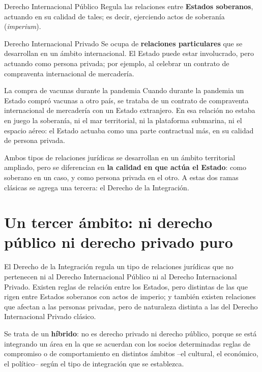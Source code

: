 \documentclass[12pt,oneside]{book}
\begin{document}
\begin{definicion}{Derecho Internacional Público}
Regula las relaciones entre \textbf{Estados soberanos}, actuando en su calidad de tales; es decir, ejerciendo actos de soberanía (\emph{imperium}).
\end{definicion}

\begin{definicion}{Derecho Internacional Privado}
Se ocupa de \textbf{relaciones particulares} que se desarrollan en un ámbito internacional. El Estado puede estar involucrado, pero actuando como persona privada; por ejemplo, al celebrar un contrato de compraventa internacional de mercadería.
\end{definicion}

\begin{ejemplo}{La compra de vacunas durante la pandemia}
Cuando durante la pandemia un Estado compró vacunas a otro país, se trataba de un contrato de compraventa internacional de mercadería con un Estado extranjero. En esa relación no estaba en juego la soberanía, ni el mar territorial, ni la plataforma submarina, ni el espacio aéreo: el Estado actuaba como una parte contractual más, en su calidad de persona privada.
\end{ejemplo}

Ambos tipos de relaciones jurídicas se desarrollan en un ámbito territorial ampliado, pero se diferencian en \textbf{la calidad en que actúa el Estado}: como soberano en un caso, y como persona privada en el otro. A estas dos ramas clásicas se agrega una tercera: el Derecho de la Integración.

\section{Un tercer ámbito: ni derecho público ni derecho privado puro}

El Derecho de la Integración regula un tipo de relaciones jurídicas que no pertenecen ni al Derecho Internacional Público ni al Derecho Internacional Privado. Existen reglas de relación entre los Estados, pero distintas de las que rigen entre Estados soberanos con actos de imperio; y también existen relaciones que afectan a las personas privadas, pero de naturaleza distinta a las del Derecho Internacional Privado clásico.

Se trata de un \textbf{híbrido}: no es derecho privado ni derecho público, porque se está integrando un área en la que se acuerdan con los socios determinadas reglas de compromiso o de comportamiento en distintos ámbitos --el cultural, el económico, el político-- según el tipo de integración que se establezca.
\end{document}
